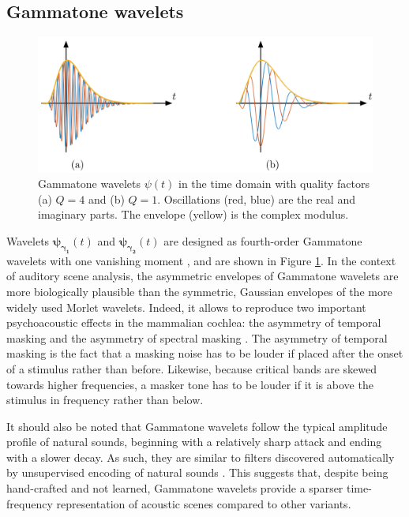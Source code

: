 \documentclass[smallextended]{svjour3}
\begin{document}
\subsection{Gammatone wavelets}
\begin{figure}
\begin{center}
\includegraphics[width=\columnwidth]{figures/gammatones}
\caption{
\label{fig:gammatones}
Gammatone wavelets $\psi(t)$ in the time domain with quality factors (a) $Q = 4$ and (b) $Q = 1$.
Oscillations (red, blue) are the real and imaginary parts. The envelope (yellow) is the complex modulus.}
\end{center}
\end{figure}
Wavelets
$\boldsymbol{\psi_{\gamma_1}}(t)$ and $\boldsymbol{\psi_{\gamma_2}}(t)$ are designed as fourth-order Gammatone
wavelets with one vanishing moment \cite{Venkitaraman2014}, and are shown in Figure \ref{fig:gammatones}.
In the context of auditory scene analysis, the asymmetric envelopes of Gammatone wavelets are more biologically plausible than the symmetric, Gaussian envelopes of the more widely used Morlet wavelets.
Indeed, it allows to reproduce two important psychoacoustic effects in the mammalian cochlea: the asymmetry of temporal masking and the asymmetry of spectral masking  \cite{Fastl2007}.
The asymmetry of temporal masking is the fact that a masking noise has to be louder if placed after the onset of a stimulus rather than before.
Likewise, because critical bands are skewed towards higher frequencies, a masker tone has to be louder if it is above the stimulus in frequency rather than below.

It should also be noted that Gammatone wavelets follow the typical amplitude profile of natural sounds, beginning with a relatively sharp attack and ending with a slower decay.
As such, they are similar to filters discovered automatically by unsupervised encoding of natural sounds \cite{Smith2006}.
This suggests that, despite being hand-crafted and not learned, Gammatone wavelets provide a sparser time-frequency representation of acoustic scenes compared to other variants.
\end{document}
